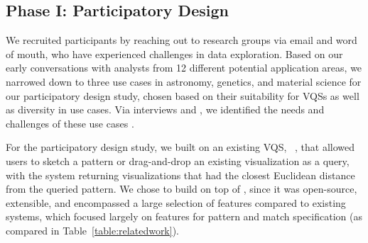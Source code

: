 \subsection{Phase I: Participatory Design}
\par We recruited participants by reaching out to research groups via email and word of mouth, who have experienced challenges in data exploration. Based on our early conversations with analysts from 12 different potential application areas, we narrowed down to three use cases in astronomy, genetics, and material science for our participatory design study, chosen based on their suitability for VQSs as well as diversity in use cases.  Via interviews and , we identified the needs and challenges of these use cases . %
\par For the participatory design study, we built on an existing VQS, \zv~\cite{Siddiqui2017,Siddiqui2017VLDB}, that allowed users to sketch a pattern or drag-and-drop an existing visualization as a query, with the system returning visualizations that had the closest Euclidean distance from the queried pattern. We chose to build on top of \zv, since it was open-source, extensible, and encompassed a large selection of features compared to existing systems, which focused largely on features for pattern and match specification (as compared in Table~\ref{table:relatedwork}). 

